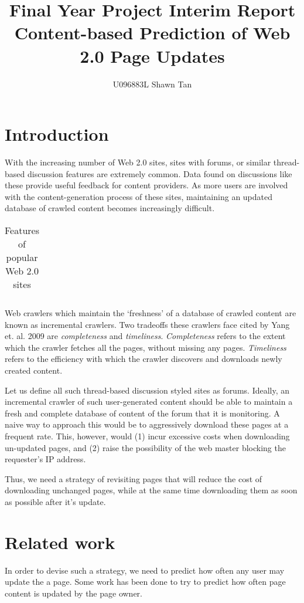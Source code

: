 \documentclass{article}
\title{Final Year Project Interim Report\\ Content-based Prediction of Web 2.0 Page Updates}
\author{U096883L Shawn Tan}
\date{}
\begin{document}
\maketitle
\section{Introduction}
With the increasing number of Web 2.0 sites, sites with forums, or similar thread-based discussion features are extremely common. Data found on discussions like these provide useful feedback for content providers. As more users are involved with the content-generation process of these sites, maintaining an updated database of crawled content becomes increasingly difficult.
\begin{table}
	\begin{center}
	{\footnotesize
	\begin{tabular}{|l|c|c|c|c|c|c|c|c|c|c|}
		\hline
			
		\hline
	\end{tabular}
	}
\end{center}
\caption{Features of popular Web 2.0 sites}
\end{table}

Web crawlers which maintain the `freshness' of a database of crawled content are known as incremental crawlers. Two tradeoffs these crawlers face cited by Yang et. al. 2009 \cite{Yang2009} are \emph{completeness} and \emph{timeliness}. \emph{Completeness} refers to the extent which the crawler fetches all the pages, without missing any pages. \emph{Timeliness} refers to the efficiency with which the crawler discovers and downloads newly created content.

Let us define all such thread-based discussion styled sites as forums. Ideally, an incremental crawler of such user-generated content should be able to maintain a fresh and complete database of content of the forum that it is monitoring. A naive way to approach this would be to aggressively download these pages at a frequent rate. This, however, would (1) incur excessive costs when downloading un-updated pages, and (2) raise the possibility of the web master blocking the requester's IP address.

Thus, we need a strategy of revisiting pages that will reduce the cost of downloading unchanged pages, while at the same time downloading them as soon as possible after it's update.

\section{Related work}
In order to devise such a strategy, we need to predict how often any user may update the a page. Some work has been done to try to predict how often page content is updated by the page owner.
\end{document}
